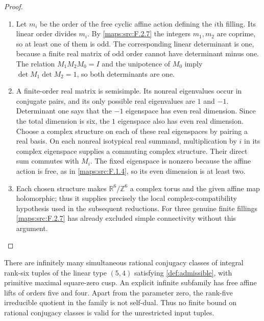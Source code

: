 \begin{proof}
\begin{enumerate}[label={$\langle1\rangle$\arabic*.}]
\item Let $m_i$ be the order of the free cyclic affine action
defining the $i$th filling.  Its linear order divides $m_i$.
By \ref{maps:src:F.2.7} the integers $m_1,m_2$ are coprime, so at least one
of them is odd.  The corresponding linear determinant is
one, because a finite real matrix of odd order cannot have
determinant minus one.  The relation
$M_1M_2M_0=I$ and the unipotence of $M_0$ imply
$\det M_1\det M_2=1$, so both determinants are one.

\item A finite-order real matrix is semisimple.  Its nonreal
eigenvalues occur in conjugate pairs, and its only possible
real eigenvalues are $1$ and $-1$.  Determinant one says
that the $-1$ eigenspace has even real dimension.  Since the
total dimension is six, the $1$ eigenspace also has even
real dimension.  Choose a complex structure on each of
these real eigenspaces by pairing a real basis.  On each
nonreal isotypical real summand, multiplication by $i$ in
its complex eigenspace supplies a commuting complex
structure.  Their direct sum commutes with $M_i$.
The fixed eigenspace is nonzero because the affine action
is free, as in \ref{maps:src:F.1.4}, so its even dimension is at least two.

\item Each chosen structure makes $\mathbb R^6/\mathbb Z^6$ a
complex torus and the given affine map holomorphic; thus it
supplies precisely the local complex-compatibility
hypothesis used in the subsequent reductions.  For three genuine
finite fillings \ref{maps:src:F.2.7} has already excluded simple
connectivity without this argument.

\end{enumerate}
\end{proof}


\begin{theorem}\hypertarget{tag-02N5}{}\label{maps:src:F.2.16}


There are infinitely many simultaneous rational conjugacy classes
of integral rank-six tuples of the linear type $(5,4)$ satisfying \cref{def:admissible},
with primitive maximal square-zero cusp.  An explicit infinite
subfamily has free affine lifts of orders five and four.
Apart from the parameter zero, the rank-five irreducible quotient
in the family is not self-dual.  Thus no finite bound on rational
conjugacy classes is valid for the unrestricted input tuples.


\end{theorem}



